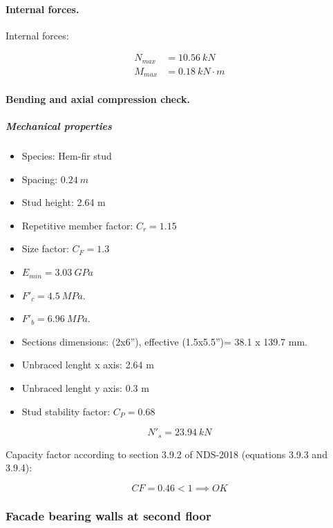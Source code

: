 \paragraph{Internal forces.}

\noindent Internal forces:

\begin{align}
  N_{max}&= 10.56\ kN \\
  M_{max}&= 0.18\ kN \cdot m
\end{align}

\paragraph{Bending and axial compression check.}

\subparagraph{Mechanical properties}

\begin{itemize}
\item Species: Hem-fir stud
\item Spacing: $0.24\ m$
\item Stud height: 2.64 m
\item Repetitive member factor: $C_r= 1.15$
\item Size factor: $C_F= 1.3$
\item $E_{min}= 3.03\ GPa$
\item $F'_c= 4.5\ MPa$.
\item $F'_b= 6.96\ MPa$.
\item Sections dimensions: (2x6''), effective (1.5x5.5'')= 38.1 x 139.7  mm.
\item Unbraced lenght x axis: 2.64 m
\item Unbraced lenght y axis: 0.3 m
\item Stud stability factor: $C_P= 0.68$
\end{itemize}

\begin{equation}
  N'_s= 23.94\ kN
\end{equation}

\noindent Capacity factor according to section 3.9.2 of NDS-2018 (equations 3.9.3 and 3.9.4):

\begin{equation}
  CF= 0.46 < 1 \implies OK
\end{equation}

\subsubsection{Facade bearing walls at second floor}

